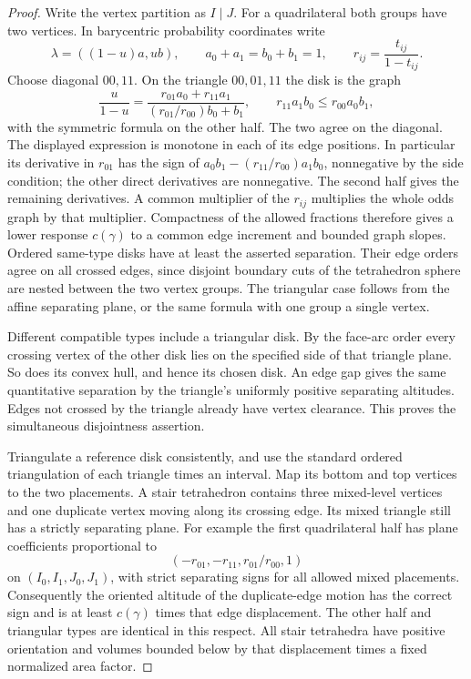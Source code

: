 \documentclass[11pt]{article}
\numberwithin{equation}{section}
\theoremstyle{definition}
\theoremstyle{remark}
\begin{document}
\begin{proof}
Write the vertex partition as $I\mid J$.  For a quadrilateral both
groups have two vertices.  In barycentric probability coordinates
write
\[
 \lambda=((1-u)a,ub),\qquad a_0+a_1=b_0+b_1=1,
 \qquad r_{ij}=\frac{t_{ij}}{1-t_{ij}}.
\]
Choose diagonal $00,11$.  On the triangle $00,01,11$ the disk is
the graph
\begin{equation}
 \frac{u}{1-u}
   =\frac{r_{01}a_0+r_{11}a_1}{(r_{01}/r_{00})b_0+b_1},
 \qquad r_{11}a_1b_0\le r_{00}a_0b_1,
 \label{ms:quad-graph}
\end{equation}
with the symmetric formula on the other half.  The two agree on the
diagonal.  The displayed expression is monotone in each of its edge
positions.  In particular its derivative in $r_{01}$ has the sign
of $a_0b_1-(r_{11}/r_{00})a_1b_0$, nonnegative by the side
condition; the other direct derivatives are nonnegative.  The
second half gives the remaining derivatives.  A common multiplier
of the $r_{ij}$ multiplies the whole odds graph by that multiplier.
Compactness of the allowed fractions therefore gives a lower
response $c(\gamma)$ to a common edge increment and bounded graph
slopes.  Ordered same-type disks have at least the asserted
separation.  Their edge orders agree on all crossed edges, since
disjoint boundary cuts of the tetrahedron sphere are nested between
the two vertex groups.  The triangular case follows from the
affine separating plane, or the same formula with one group a
single vertex.

Different compatible types include a triangular disk.  By the
face-arc order every crossing vertex of the other disk lies on the
specified side of that triangle plane.  So does its convex hull,
and hence its chosen disk.  An edge gap gives the same quantitative
separation by the triangle's uniformly positive separating
altitudes.  Edges not crossed by the triangle already have vertex
clearance.  This proves the simultaneous disjointness assertion.

Triangulate a reference disk consistently, and use the standard
ordered triangulation of each triangle times an interval.  Map its
bottom and top vertices to the two placements.  A stair tetrahedron
contains three mixed-level vertices and one duplicate vertex moving
along its crossing edge.  Its mixed triangle still has a strictly
separating plane.  For example the first quadrilateral half has
plane coefficients proportional to
\[
 (-r_{01},-r_{11},r_{01}/r_{00},1)
\]
on $(I_0,I_1,J_0,J_1)$, with strict separating signs for all allowed
mixed placements.  Consequently the oriented altitude of the
duplicate-edge motion has the correct sign and is at least
$c(\gamma)$ times that edge displacement.  The other half and
triangular types are identical in this respect.  All stair
tetrahedra have positive orientation and volumes bounded below by
that displacement times a fixed normalized area factor.


\end{proof}
\end{document}

